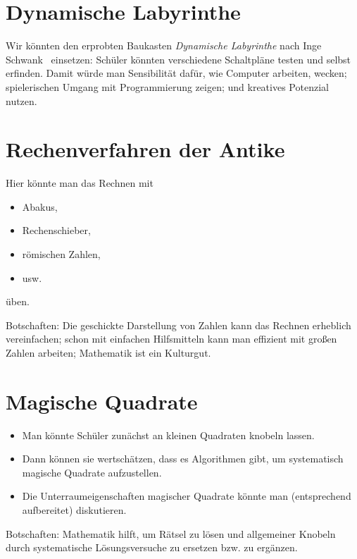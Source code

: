 \documentclass[a4paper,ngerman]{scrartcl}
\begin{document}
\section*{Dynamische Labyrinthe}

Wir könnten den erprobten Baukasten \emph{Dynamische Labyrinthe} nach Inge
Schwank~\cite{laby} einsetzen:
Schüler könnten verschiedene Schaltpläne testen und selbst erfinden. Damit
würde man Sensibilität dafür, wie Computer arbeiten, wecken; spielerischen
Umgang mit Programmierung zeigen; und kreatives Potenzial nutzen.


\section*{Rechenverfahren der Antike}

Hier könnte man das Rechnen mit
\begin{itemize}
\item Abakus,
\item Rechenschieber,
\item römischen Zahlen,
\item usw.
\end{itemize}
üben.

Botschaften: Die geschickte Darstellung von Zahlen kann das Rechnen erheblich
vereinfachen; schon mit einfachen Hilfsmitteln kann man effizient mit großen
Zahlen arbeiten; Mathematik ist ein Kulturgut.


\section*{Magische Quadrate}

\begin{itemize}
\item Man könnte Schüler zunächst an kleinen Quadraten knobeln lassen.
\item Dann können sie wertschätzen, dass es Algorithmen gibt, um systematisch
magische Quadrate aufzustellen.
\item Die Unterraumeigenschaften magischer Quadrate könnte man (entsprechend
aufbereitet) diskutieren.
\end{itemize}

Botschaften: Mathematik hilft, um Rätsel zu lösen und allgemeiner Knobeln durch
systematische Lösungsversuche zu ersetzen bzw. zu ergänzen.

\renewcommand\refname{Internetverweise}
\nocite{*}
\printbibliography
\end{document}

